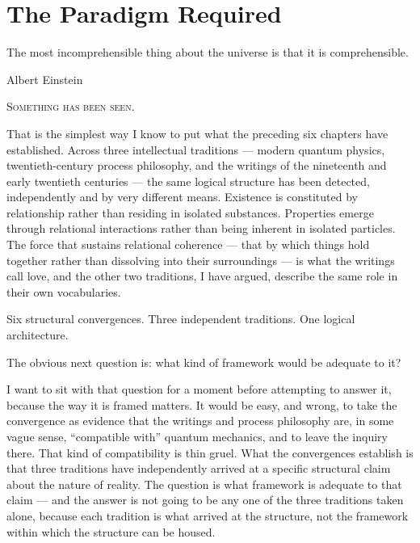 
\chapter{The Paradigm Required}
\label{ch:paradigm-required}

\epigraph{The most incomprehensible thing about the universe is that it is
comprehensible.}{Albert Einstein}


\noindent\textsc{Something has been seen.}

That is the simplest way I know to put what the preceding six chapters have
established. Across three intellectual traditions --- modern quantum physics,
twentieth-century process philosophy, and the \bahai writings of the nineteenth
and early twentieth centuries --- the same logical structure has been detected,
independently and by very different means. Existence is constituted by
relationship rather than residing in isolated substances. Properties emerge
through relational interactions rather than being inherent in isolated
particles. The force that sustains relational coherence --- that by which
things hold together rather than dissolving into their surroundings --- is what
the \bahai writings call love, and the other two traditions, I have argued,
describe the same role in their own vocabularies.

Six structural convergences. Three independent traditions. One logical
architecture.

The obvious next question is: what kind of framework would be adequate to it?

I want to sit with that question for a moment before attempting to answer it,
because the way it is framed matters. It would be easy, and wrong, to take the
convergence as evidence that the \bahai writings and process philosophy are, in
some vague sense, ``compatible with'' quantum mechanics, and to leave the
inquiry there. That kind of compatibility is thin gruel. What the convergences
establish is that three traditions have independently arrived at a specific
structural claim about the nature of reality. The question is what framework is
adequate to that claim --- and the answer is not going to be any one of the
three traditions taken alone, because each tradition is what arrived at the
structure, not the framework within which the structure can be housed.

